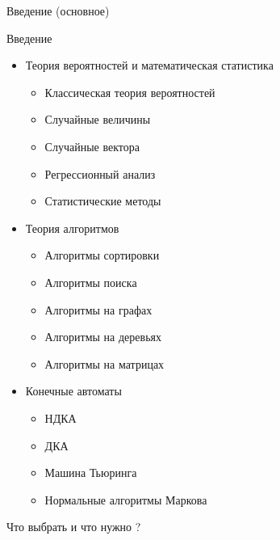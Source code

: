 \documentclass{beamer}
\begin{document}
\begin{section}{Введение (основное)}
\begin{frame}{Введение}
    \begin{itemize}
        \item Теория вероятностей и математическая статистика 
            \begin{itemize}
                \item Классическая теория вероятностей
                \item Случайные величины
                \item Случайные вектора
                \item Регрессионный анализ
                \item Статистические методы
            \end{itemize}
        \item Теория алгоритмов 
            \begin{itemize}
                \item Алгоритмы сортировки
                \item Алгоритмы поиска
                \item Алгоритмы на графах
                \item Алгоритмы на деревьях
                \item Алгоритмы на матрицах
            \end{itemize}
        \item Конечные автоматы 
            \begin{itemize}
                \item НДКА
                \item ДКА
                \item Машина Тьюринга
                \item Нормальные алгоритмы Маркова
            \end{itemize}
    \end{itemize}
    Что выбрать и что нужно ?
\end{frame}
\end{section}
\end{document}
